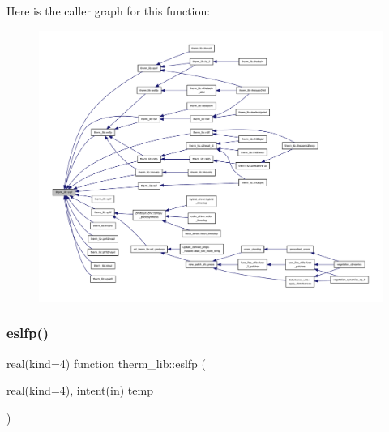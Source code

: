 Here is the caller graph for this function\+:
\nopagebreak
\begin{figure}[H]
\begin{center}
\leavevmode
\includegraphics[width=350pt]{namespacetherm__lib_a82ae02323247d6435153002a309552fb_icgraph}
\end{center}
\end{figure}
\mbox{\label{namespacetherm__lib_a4339cfce3e15e3410bcc7ba6a7d6ba06}} 
\subsubsection{\texorpdfstring{eslfp()}{eslfp()}}
{\footnotesize\ttfamily real(kind=4) function therm\+\_\+lib\+::eslfp (\begin{DoxyParamCaption}\item[{real(kind=4), intent(in)}]{temp }\end{DoxyParamCaption})}

